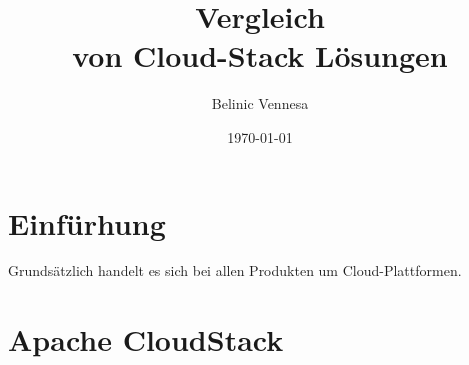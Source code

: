 \documentclass[a4paper,nochapterprefix,ngerman,12pt]{scrreprt}
\title{Vergleich\\von Cloud-Stack Lösungen}
\author{Belinic Vennesa}
\date{\today}
\begin{document}
\maketitle
{}

\newpage
\tableofcontents

\newpage
{}

\chapter{Einfürhung} \thispagestyle{fancy}
Grundsätzlich handelt es sich bei allen Produkten um Cloud-Plattformen.

\chapter{Apache CloudStack} \thispagestyle{fancy}
\end{document}
